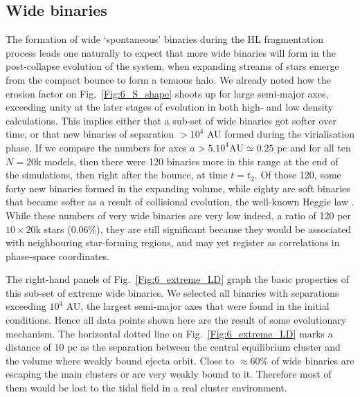 \subsection{Wide binaries}


The formation of wide `spontaneous' binaries during the HL fragmentation process leads one naturally to expect that more wide binaries will form in the post-collapse evolution of the system, when expanding streams of stars emerge from the compact bounce to form a tenuous halo. We already noted how the erosion factor on Fig.~\ref{Fig:6_S_shape} shoots up for large semi-major axes, exceeding unity at the later stages of evolution in both high- and low density calculations. This implies either that a sub-set of wide binaries got softer over time, or that new binaries of separation $> 10^4$ AU formed during the virialisation phase. If we compare the numbers for axes $a > 5.10^4 \textrm{AU} \simeq 0.25$ pc and for all ten $N = 20$k models, then there were 120 binaries more  in this range at the end of the simulations, then right after the bounce, at time $t = t_2$.  Of those 120, some forty new binaries formed in the expanding volume, while eighty are  soft binaries that became softer as a result of collisional evolution, the well-known Heggie law \citep{Heggie1975,Hills1975}. While these numbers of very wide binaries  are very low indeed, a ratio of 120 per $10 \times 20$k  stars (0.06\%), they are still significant because they would be associated with neighbouring star-forming regions, and  may yet register as correlations in phase-space coordinates. 
  

The right-hand panels of Fig.~\ref{Fig:6_extreme_LD} graph the basic properties of this sub-set of extreme wide binaries. We selected all  binaries with separations exceeding $10^4$ AU, the largest semi-major axes that were found in the initial conditions. Hence all data points shown here are the result of some evolutionary mechanism. The horizontal dotted line on Fig.~\ref{Fig:6_extreme_LD} marks a distance of $10$ pc as the separation between the central  equilibrium cluster and the volume where weakly bound ejecta orbit. Close to $\approx 60\% $ of wide binaries are escaping the main clusters or are very weakly bound to it.   Therefore most of them would be lost to the tidal field in a real cluster environment.  
 

